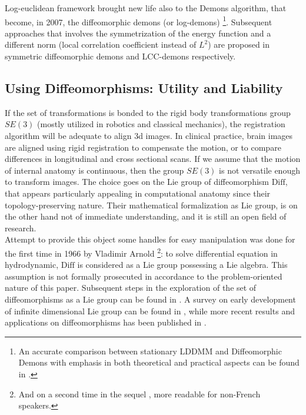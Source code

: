 \begin{enumerate}
	Log-euclidean framework brought new life also to the Demons algorithm, that  become, in 2007, the diffeomorphic demons (or log-demons) \cite{vercauteren2007non}\footnote{An accurate comparison between stationary LDDMM and Diffeomorphic Demons with emphasis in both theoretical and practical aspects can be found in \cite{hernandez2008comparing}.}. Subsequent approaches that involves the symmetrization of the energy function and a different norm (local correlation coefficient instead of $L^{2}$) are proposed in symmetric diffeomorphic demons \cite{vercauteren08} and LCC-demons \cite{lorenzi2013lcc} respectively.
	
\end{enumerate}


\subsection{Using Diffeomorphisms: Utility and Liability}\label{se:diffe_util_and_liab}

If the set of transformations is bonded to the rigid body transformations group $SE(3)$ (mostly utilized in robotics and classical mechanics), the registration algorithm will be adequate to align 3d images. In clinical practice, brain images are aligned using rigid registration to compensate the motion, or to compare differences in longitudinal and cross sectional scans. If we assume that the motion of internal anatomy is continuous, then the group $SE(3)$ is not versatile enough to transform images. The choice goes on the Lie group of diffeomorphism $\text{Diff}$, that appears particularly appealing in computational anatomy since their topology-preserving nature. 
Their mathematical formalization as Lie group, is on the other hand not of immediate understanding, and it is still an open field of research.\\ 
Attempt to provide this object some handles for easy manipulation was done for the first time in 1966 by Vladimir Arnold \cite{arnold1966geometrie} \footnote{And on a second time in the sequel \cite{arnold1998topological}, more readable for non-French speakers.}: to solve differential equation in hydrodynamic, $\text{Diff}$ is considered as a Lie group possessing a Lie algebra. This assumption is not formally prosecuted in accordance to the problem-oriented nature of this paper. Subsequent steps in the exploration of the set of diffeomorphisms as a Lie group can be found in \cite{marsden1970hamiltonian, ebin1970groups, omori1970group, leslie1983lie}. A survey on early development of infinite dimensional Lie group can be found in \cite{Milnor:84:remarks}, while more recent results and applications on diffeomorphisms has been published in \cite{ovsienko1992integrals, bauer2010sobolev,schmid2010infinite,  bauer2011geodesic}.\\

